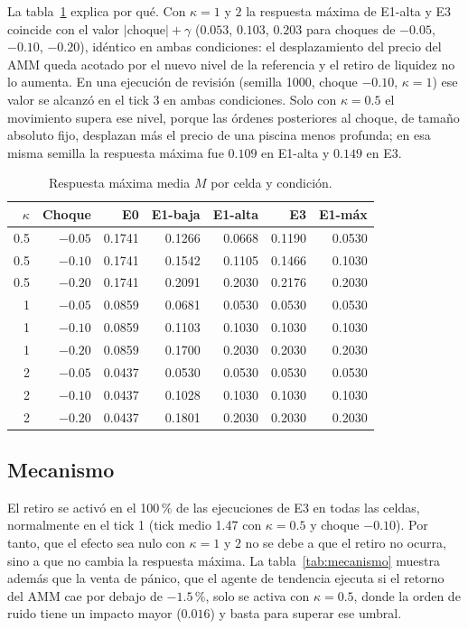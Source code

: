 La tabla~\ref{tab:respuesta} explica por qué. Con $\kappa=1$ y $2$ la respuesta máxima de E1-alta y E3 coincide con el valor $|\text{choque}|+\gamma$ ($0.053$, $0.103$, $0.203$ para choques de $-0.05$, $-0.10$, $-0.20$), idéntico en ambas condiciones: el desplazamiento del precio del AMM queda acotado por el nuevo nivel de la referencia y el retiro de liquidez no lo aumenta. En una ejecución de revisión (semilla 1000, choque $-0.10$, $\kappa=1$) ese valor se alcanzó en el tick 3 en ambas condiciones. Solo con $\kappa=0.5$ el movimiento supera ese nivel, porque las órdenes posteriores al choque, de tamaño absoluto fijo, desplazan más el precio de una piscina menos profunda; en esa misma semilla la respuesta máxima fue $0.109$ en E1-alta y $0.149$ en E3.

\begin{table}[htbp]
\centering
\caption{Respuesta máxima media $M$ por celda y condición.}
\label{tab:respuesta}
\small
\begin{tabular}{@{}rrrrrrr@{}}
\toprule
$\kappa$ & Choque & E0 & E1-baja & E1-alta & E3 & E1-máx \\
\midrule
0.5 & $-0.05$ & 0.1741 & 0.1266 & 0.0668 & 0.1190 & 0.0530 \\
0.5 & $-0.10$ & 0.1741 & 0.1542 & 0.1105 & 0.1466 & 0.1030 \\
0.5 & $-0.20$ & 0.1741 & 0.2091 & 0.2030 & 0.2176 & 0.2030 \\
1 & $-0.05$ & 0.0859 & 0.0681 & 0.0530 & 0.0530 & 0.0530 \\
1 & $-0.10$ & 0.0859 & 0.1103 & 0.1030 & 0.1030 & 0.1030 \\
1 & $-0.20$ & 0.0859 & 0.1700 & 0.2030 & 0.2030 & 0.2030 \\
2 & $-0.05$ & 0.0437 & 0.0530 & 0.0530 & 0.0530 & 0.0530 \\
2 & $-0.10$ & 0.0437 & 0.1028 & 0.1030 & 0.1030 & 0.1030 \\
2 & $-0.20$ & 0.0437 & 0.1801 & 0.2030 & 0.2030 & 0.2030 \\
\bottomrule
\end{tabular}
\end{table}

\subsection{Mecanismo}

El retiro se activó en el 100\,\% de las ejecuciones de E3 en todas las celdas, normalmente en el tick 1 (tick medio 1.47 con $\kappa=0.5$ y choque $-0.10$). Por tanto, que el efecto sea nulo con $\kappa=1$ y $2$ no se debe a que el retiro no ocurra, sino a que no cambia la respuesta máxima. La tabla~\ref{tab:mecanismo} muestra además que la venta de pánico, que el agente de tendencia ejecuta si el retorno del AMM cae por debajo de $-1.5\,\%$, solo se activa con $\kappa=0.5$, donde la orden de ruido tiene un impacto mayor ($0.016$) y basta para superar ese umbral.

